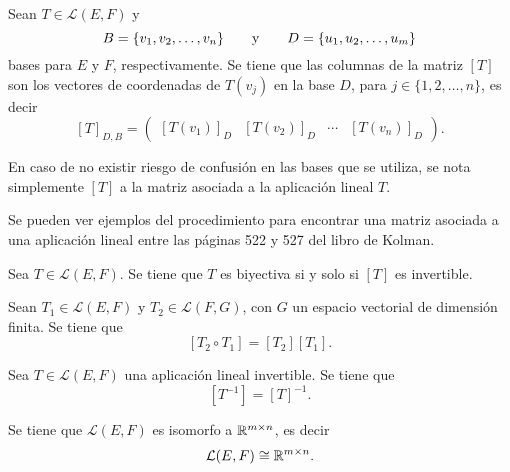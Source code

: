 \documentclass[a4,11pt]{aleph-notas}
\begin{document}
\begin{teo}
    Sean $T \in \mathcal{L}(E,F)$ y 
    \[
        B = \{v_1,v_2,\ldots,v_n\}
        \texty
        D = \{u_1,u_2,\ldots,u_m\}
    \]
    bases para $E$ y $F$, respectivamente. Se tiene que las columnas de la matriz $[T]$ son los vectores de coordenadas de $T(v_j)$ en la base $D$, para $j\in\{1,2,\ldots,n\}$, es decir
    \[
        [T]_{D,B} = \begin{pmatrix}
            [T(v_1)]_D & [T(v_2)]_D & \cdots & [T(v_n)]_D
        \end{pmatrix}.
    \]
\end{teo}

\begin{advertencia}
    En caso de no existir riesgo de confusión en las bases que se utiliza, se nota simplemente $[T]$ a la matriz asociada a la aplicación lineal $T$. 
\end{advertencia}


Se pueden ver ejemplos del procedimiento para encontrar una matriz asociada a una aplicación lineal entre las páginas 522 y 527 del libro de Kolman.




\begin{teo}
    Sea $T \in \mathcal{L}(E,F)$. Se tiene que $T$ es biyectiva si y solo si $[T]$ es invertible.
\end{teo}



\begin{teo}
    Sean $T_1 \in \mathcal{L}(E,F)$ y $T_2\in\mathcal{L}(F,G)$, con $G$ un espacio vectorial de dimensión finita. Se tiene que
    \[
        [T_2\circ T_1] = [T_2][T_1].
    \]
\end{teo}


\begin{teo}
    Sea $T\in \mathcal{L}(E,F)$ una aplicación lineal invertible. Se tiene que
    \[
        [T^{-1}] = [T]^{-1}.
    \]
\end{teo}


\begin{teo}
    Se tiene que $\mathcal{L}(E,F)$ es isomorfo a $\Mat[\R]{m}{n}$, es decir
    \[
        \mathcal{L}(E,F)
        \cong
        \Mat[\R]{m}{n}.
    \]
\end{teo}
\end{document}
